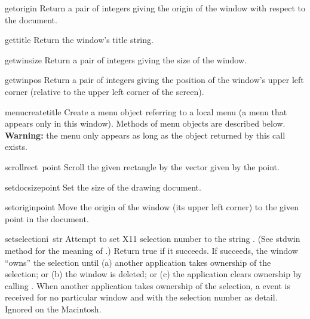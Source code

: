 \begin{funcdesc}{getorigin}{}
Return a pair of integers giving the origin of the window with respect
to the document.
\end{funcdesc}

\begin{funcdesc}{gettitle}{}
Return the window's title string.
\end{funcdesc}

\begin{funcdesc}{getwinsize}{}
Return a pair of integers giving the size of the window.
\end{funcdesc}

\begin{funcdesc}{getwinpos}{}
Return a pair of integers giving the position of the window's upper
left corner (relative to the upper left corner of the screen).
\end{funcdesc}

\begin{funcdesc}{menucreate}{title}
Create a menu object referring to a local menu (a menu that appears
only in this window).
Methods of menu objects are described below.
{\bf Warning:} the menu only appears as long as the object
returned by this call exists.
\end{funcdesc}

\begin{funcdesc}{scroll}{rect\, point}
Scroll the given rectangle by the vector given by the point.
\end{funcdesc}

\begin{funcdesc}{setdocsize}{point}
Set the size of the drawing document.
\end{funcdesc}

\begin{funcdesc}{setorigin}{point}
Move the origin of the window (its upper left corner)
to the given point in the document.
\end{funcdesc}

\begin{funcdesc}{setselection}{i\, str}
Attempt to set X11 selection number
to the string
.
(See stdwin method
for the meaning of
.)
Return true if it succeeds.
If  succeeds, the window ``owns'' the selection until
(a) another application takes ownership of the selection; or
(b) the window is deleted; or
(c) the application clears ownership by calling
.
When another application takes ownership of the selection, a
event is received for no particular window and with the selection number
as detail.
Ignored on the Macintosh.
\end{funcdesc}

